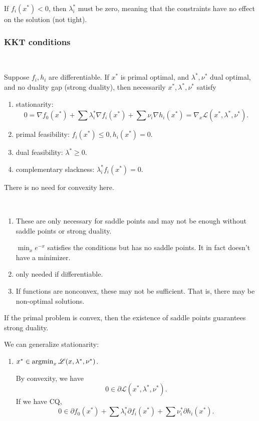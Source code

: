 \documentclass[class=article,crop=false]{standalone}
\begin{document}
If $ f_i(x^* )<0$, then $ \lambda_i^* $ must be zero, meaning that the constraints have no effect on the solution (not tight).

\subsubsection{KKT conditions}
~\begin{thm}
	Suppose $ f_i,h_i$ are differentiable. If $ x^* $ is primal optimal, and $ \lambda^*,\nu^*  $ dual optimal, and no duality gap (strong duality), then necessarily $ x^* ,\lambda^* ,\nu^* $ satisfy
	\begin{enumerate}[label=(\arabic*)]
		\item stationarity: 
			 \[
				 0 = \nabla f_0(x^* ) + \sum \lambda_i^* \nabla f_i(x^* ) + \sum \nu_i  \nabla h_i(x^* ) = \nabla _x \mathscr{L}(x^* ,\lambda^* ,\nu^* )
			.\] 
		\item primal feasibility: $ f_i(x^* )\leq 0, h_i(x^* ) =0$.
		\item dual feasibility: $ \lambda^* \geq 0$.
		\item complementary slackness: $ \lambda_i^* f_i(x^* ) =0$.
	\end{enumerate}
\end{thm}
\begin{note}
There is no need for convexity here.
\end{note}
\begin{remark}
~\begin{enumerate}[label=(\alph*)]
	\item These are only necessary for saddle points and may not be enough without saddle points or strong duality.
		\begin{eg}
		$ \min_x e^{-x}$ satisfies the conditions but has no saddle points. It in fact doesn't have a minimizer. 
		\end{eg}
	\item only needed if differentiable.
	\item If functions are nonconvex, these may not be sufficient. That is, there may be non-optimal solutions.
\end{enumerate}
\end{remark}
\begin{remark}
If the primal problem is convex, then the existence of saddle points guarantees strong duality.
\end{remark}

We can generalize stationarity:
\begin{enumerate}[label=(\arabic*)]
	\item $ x^*  \in \operatorname*{argmin}_x \mathscr{L}(x,\lambda^* ,\nu^* )$.

			By convexity, we have
			\[
				0 \in \partial \mathscr{L}(x^* ,\lambda^* ,\nu^* )
			.\] 
			If we have CQ,
			\[
				0 \in \partial f_0(x^* ) + \sum \lambda_i^* \partial f_i(x^* ) + \sum \nu_i^* \partial h_i(x^* )
			.\] 
\end{enumerate}
\end{document}
